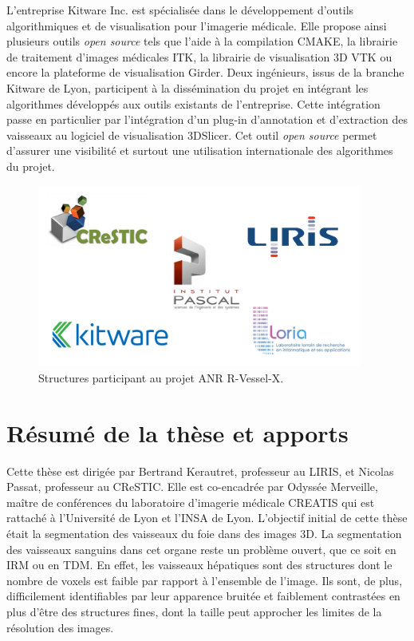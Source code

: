 L'entreprise Kitware Inc. est spécialisée dans le développement d'outils algorithmiques et de visualisation pour l'imagerie médicale. Elle propose ainsi plusieurs outils \textit{open source} tels que l'aide à la compilation CMAKE, la librairie de traitement d'images médicales ITK, la librairie de visualisation 3D VTK ou encore la plateforme de visualisation Girder. Deux ingénieurs, issus de la branche Kitware de Lyon, participent à la dissémination du projet en intégrant les algorithmes développés aux outils existants de l'entreprise. Cette intégration passe en particulier par l'intégration d'un plug-in d'annotation et d'extraction des vaisseaux au logiciel de visualisation 3DSlicer. Cet outil \textit{open source} permet d'assurer une visibilité et surtout une utilisation internationale des algorithmes du projet.

\begin{figure}[ht]
    \centering
    \includegraphics[height=6cm]{Images/labs.png}
    \caption{Structures participant au projet ANR R-Vessel-X.}
    \label{fig:labs}
  \end{figure}

\section{Résumé de la thèse et apports}
\label{sec:introduction:résumé}

Cette thèse est dirigée par Bertrand Kerautret, professeur au LIRIS, et Nicolas Passat, professeur au CReSTIC. Elle est co-encadrée par Odyssée Merveille, maître de conférences du laboratoire d'imagerie médicale CREATIS qui  est rattaché à l'Université de Lyon et l'INSA de Lyon. L'objectif initial de cette thèse était la segmentation des vaisseaux du foie dans des images 3D. La segmentation des vaisseaux sanguins dans cet organe reste un problème ouvert, que ce soit en IRM ou en TDM. En effet, les vaisseaux hépatiques sont des structures dont le nombre de voxels est faible par rapport à l'ensemble de l'image. Ils sont, de plus, difficilement identifiables par leur apparence bruitée et faiblement contrastées en plus d'être des structures fines, dont la taille peut approcher les limites de la résolution des images.

